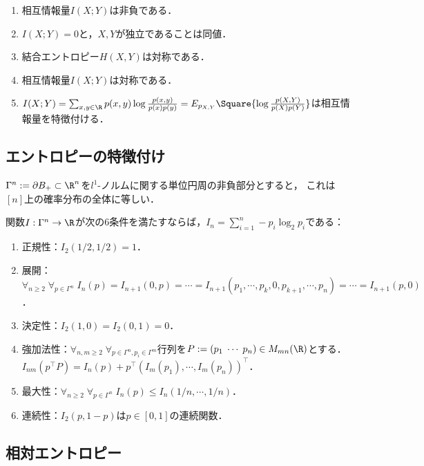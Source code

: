 \documentclass[uplatex,dvipdfmx]{jsreport}
\begin{document}
\begin{lemma}\mbox{}
    \begin{enumerate}
        \item 相互情報量$I(X;Y)$は非負である．
        \item $I(X;Y)=0$と，$X,Y$が独立であることは同値．
        \item 結合エントロピー$H(X,Y)$は対称である．
        \item 相互情報量$I(X;Y)$は対称である．
        \item $I(X;Y)=\sum_{x,y\in\R}p(x,y)\log\frac{p(x,y)}{p(x)p(y)}=E_{p_{X,Y}}\Square{\log\frac{p(X,Y)}{p(X)p(Y)}}$は相互情報量を特徴付ける．
    \end{enumerate}
\end{lemma}

\subsection{エントロピーの特徴付け}

\begin{notation}
    $\Gamma^n:=\partial B_+\subset\R^n$を$l^1$-ノルムに関する単位円周の非負部分とすると，
    これは$[n]$上の確率分布の全体に等しい．
\end{notation}

\begin{theorem}[\cite{有本}]
    関数$I:\Gamma^n\to\R$が次の6条件を満たすならば，$I_n=\sum_{i=1}^n-p_i\log_2p_i$である：
    \begin{enumerate}
        \item 正規性：$I_2(1/2,1/2)=1$．
        \item 展開：$\forall_{n\ge2}\;\forall_{p\in\Gamma^n}\;I_n(p)=I_{n+1}(0,p)=\cdots=I_{n+1}(p_1,\cdots,p_k,0,p_{k+1},\cdots,p_n)=\cdots=I_{n+1}(p,0)$．
        \item 決定性：$I_2(1,0)=I_2(0,1)=0$．
        \item 強加法性：$\forall_{n,m\ge2}\;\forall_{p\in\Gamma^n,p_i\in\Gamma^m}$行列を$P:=(p_1\;\cdots\;p_n)\in M_{mn}(\R)$とする．$I_{nm}(p^\top P)=I_n(p)+p^\top(I_m(p_1),\cdots,I_m(p_n))^\top$．
        \item 最大性：$\forall_{n\ge2}\;\forall_{p\in\Gamma^n}\;I_n(p)\le I_n(1/n,\cdots,1/n)$．
        \item 連続性：$I_2(p,1-p)$は$p\in[0,1]$の連続関数．
    \end{enumerate}
\end{theorem}

\subsection{相対エントロピー}
\end{document}
